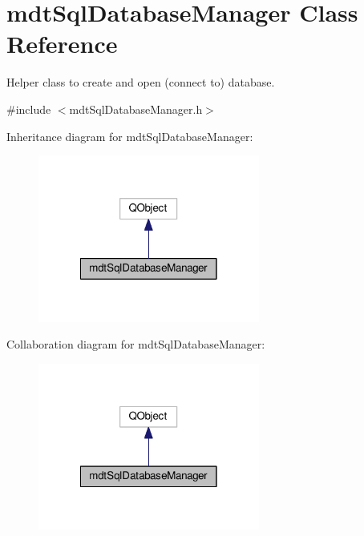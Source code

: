 \hypertarget{classmdt_sql_database_manager}{\section{mdt\-Sql\-Database\-Manager Class Reference}
\label{classmdt_sql_database_manager}
}


Helper class to create and open (connect to) database.  




{\ttfamily \#include $<$mdt\-Sql\-Database\-Manager.\-h$>$}



Inheritance diagram for mdt\-Sql\-Database\-Manager\-:
\nopagebreak
\begin{figure}[H]
\begin{center}
\leavevmode
\includegraphics[width=206pt]{classmdt_sql_database_manager__inherit__graph}
\end{center}
\end{figure}


Collaboration diagram for mdt\-Sql\-Database\-Manager\-:
\nopagebreak
\begin{figure}[H]
\begin{center}
\leavevmode
\includegraphics[width=206pt]{classmdt_sql_database_manager__coll__graph}
\end{center}
\end{figure}
